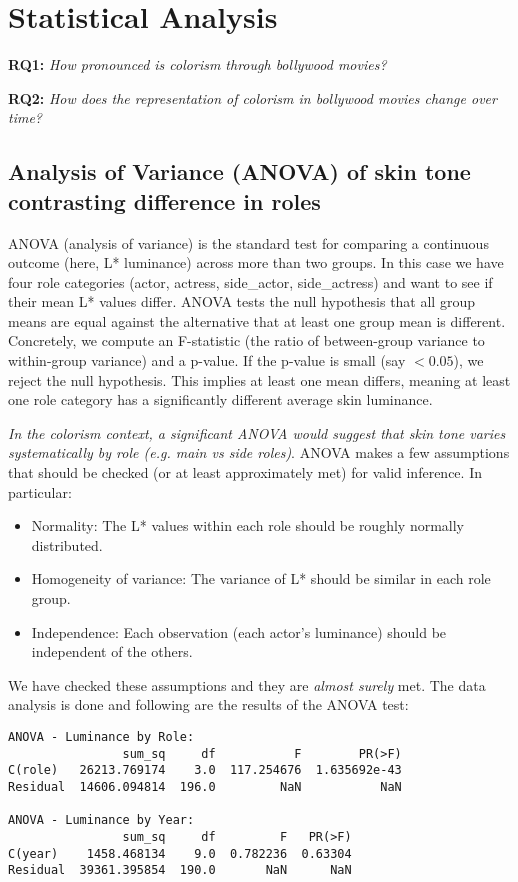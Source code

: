 \section{Statistical Analysis}
\label{sec:statistical-analysis}

\textbf{RQ1:} \textit{How pronounced is colorism through bollywood movies?}

\textbf{RQ2:} \textit{How does the representation of colorism in bollywood movies change over time?}

\subsection{Analysis of Variance (ANOVA) of skin tone contrasting difference in roles}

ANOVA (analysis of variance) is the standard test for comparing a continuous outcome (here, L* luminance) across more than two groups. In this case we have four role categories (actor, actress, side\_actor, side\_actress) and want to see if their mean L* values differ. ANOVA tests the null hypothesis that all group means are equal against the alternative that at least one group mean is different. 
Concretely, we compute an F-statistic (the ratio of between-group variance to within-group variance) and a p-value. If the p-value is small (say $<0.05$), we reject the null hypothesis. This implies at least one mean differs, meaning at least one role category has a significantly different average skin luminance. 

\textit{In the colorism context, a significant ANOVA would suggest that skin tone varies systematically by role (e.g. main vs side roles)}. ANOVA makes a few assumptions that should be checked (or at least approximately met) for valid inference. In particular:

\begin{itemize}
    \item Normality: The L* values within each role should be roughly normally distributed.
    \item Homogeneity of variance: The variance of L* should be similar in each role group.
    \item Independence: Each observation (each actor's luminance) should be independent of the others.
\end{itemize}

We have checked these assumptions and they are \textit{almost surely} met. The data analysis is done and following are the results of the ANOVA test:
\begin{lstlisting}
ANOVA - Luminance by Role:
                sum_sq     df           F        PR(>F)
C(role)   26213.769174    3.0  117.254676  1.635692e-43
Residual  14606.094814  196.0         NaN           NaN

ANOVA - Luminance by Year:
                sum_sq     df         F   PR(>F)
C(year)    1458.468134    9.0  0.782236  0.63304
Residual  39361.395854  190.0       NaN      NaN
\end{lstlisting}

